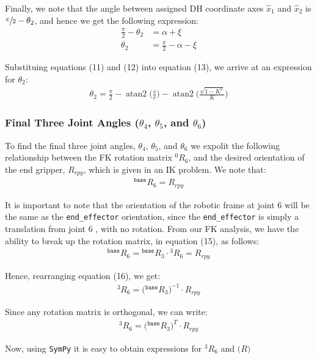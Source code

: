 \documentclass[a4paper]{article}
\DeclareMathOperator{\atantwo}{atan2}
\begin{document}
Finally, we note that the angle between assigned DH coordinate axes $\hat{x}_1$ and $\hat{x}_2$ is $\sfrac{\pi}{2} - \theta_2$, and hence we get the following expression:
\begin{align}
\frac{\pi}{2} - \theta_2 &= \alpha + \xi \nonumber\\
\theta_2 &= \frac{\pi}{2} - \alpha - \xi
\end{align}

Substituing equations (11) and (12) into equation (13), we arrive at an expression for $\theta_2$:
\begin{align}
\theta_2 = \frac{\pi}{2} - \atantwo \bigg(\frac{s}{r}\bigg) - \atantwo \bigg(\frac{\sqrt{1 - K^2}}{K}\bigg)
\end{align}

\subsubsection{Final Three Joint Angles ($\theta_4$, $\theta_5$, and $\theta_6$)}
To find the final three joint angles, $\theta_4$, $\theta_5$, and $\theta_6$ we expolit the following relationship between the FK rotation matrix $^0 R_6$, and the desired orientation of the end gripper, $R_{rpy}$, which is given in an IK problem. We note that:
\begin{align}
^\texttt{base} R_6 = R_{rpy}
\end{align}

It is important to note that the orientation of the robotic frame at joint 6 will be the same as the \verb|end_effector| orientation, since the \verb|end_effector| is simply a translation from joint 6 , with no rotation. From our FK analysis, we have the ability to break up the rotation matrix, in equation (15), as follows:
\begin{align}
^\texttt{base} R_6 = {}^{\texttt{base}}R_3 \cdot {}^{3}R_6 = R_{rpy}
\end{align}

Hence, rearranging equation (16), we get:
\begin{align*}
^3 R_6 = \big({}^{\texttt{base}}R_3\big)^{-1} \cdot R_{rpy}
\end{align*}

Since any rotation matrix is orthogonal, we can write:
\begin{align}
^3 R_6 = \big({}^{\texttt{base}}R_3\big)^{T} \cdot R_{rpy}
\end{align}

Now, using \verb|SymPy| it is easy to obtain expressions for $^3 R_6$ and $\big( R \big)$
\end{document}
